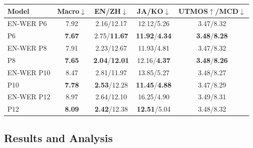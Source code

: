 \documentclass{article}
\begin{document}
\par\smallskip
\noindent\begin{minipage}{\columnwidth}
\centering
{}
\label{tab:criterion_comparison}
\small
\setlength{\tabcolsep}{1.0pt}
\renewcommand{\arraystretch}{1.05}
\begin{tabular}{lcccc}
\toprule
\textbf{Model} &
\textbf{Macro$\downarrow$} &
\textbf{EN/ZH$\downarrow$} &
\textbf{JA/KO$\downarrow$} &
\textbf{UTMOS$\uparrow$/MCD$\downarrow$} \\
\midrule
EN-WER P6 & 7.92 & 2.16/12.17 & 12.12/5.26 & 3.47/8.32 \\
P6 & \textbf{7.67} & 2.75/\textbf{11.67} & \textbf{11.92}/\textbf{4.34} & \textbf{3.48}/\textbf{8.28} \\
EN-WER P8 & 7.91 & 2.23/12.67 & 11.93/4.81 & 3.47/8.32 \\
P8 & \textbf{7.65} & \textbf{2.04}/\textbf{12.01} & 12.16/\textbf{4.37} & \textbf{3.48}/\textbf{8.26} \\
EN-WER P10 & 8.47 & 2.81/11.97 & 13.85/5.27 & 3.48/8.27 \\
P10 & \textbf{7.78} & \textbf{2.53}/12.28 & \textbf{11.45}/\textbf{4.88} & 3.47/8.29 \\
EN-WER P12 & 8.97 & 2.64/12.10 & 16.25/4.90 & 3.49/8.31 \\
P12 & \textbf{8.09} & \textbf{2.42}/12.38 & \textbf{12.51}/5.04 & 3.48/8.32 \\
\bottomrule
\end{tabular}%
\end{minipage}\par\smallskip

\subsection{Results and Analysis}
\label{sec:results}
\end{document}
